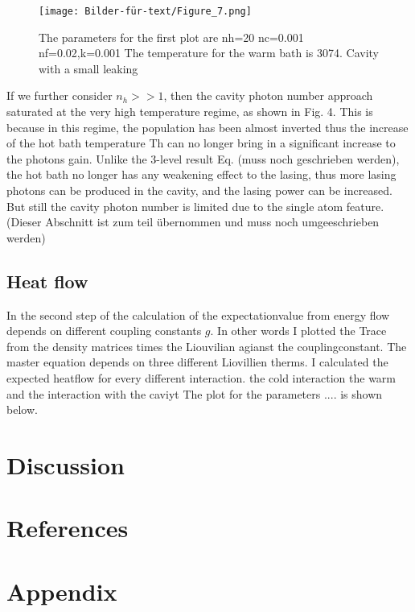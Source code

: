 \documentclass[12pt,a4paper]{article}
\begin{document}
\begin{figure}[h!]
\centering
\texttt{[image: Bilder-für-text/Figure\_7.png]}
\caption{The parameters for the first plot are nh=20 nc=0.001 nf=0.02,k=0.001 The temperature for the warm bath is 3074. Cavity with a small leaking}
\end{figure}

If we further consider  $n_h >>1$,
then the cavity photon number approach saturated at the very
high temperature regime, as shown in Fig. 4. This is because
in this regime, the population has been almost inverted
 thus the increase of the hot bath temperature Th
can no longer bring in a significant increase to the photons gain.
Unlike the 3-level result Eq. (muss noch geschrieben werden), the hot bath no longer has
any weakening effect to the lasing, thus more lasing photons
can be produced in the cavity, and the lasing power can be
increased. But still the cavity photon number is limited due to
the single atom feature.(Dieser Abschnitt ist zum teil übernommen und muss noch umgeeschrieben werden)
\subsection{Heat flow}
In the second step of the calculation of the  expectationvalue from energy flow depends on different coupling constants $g$.
In other words I plotted the Trace from the density matrices times the Liouvilian agianst the couplingconstant.
The master equation depends on three different Liovillien therms. I calculated the expected heatflow for every different interaction. the cold interaction the warm and the interaction with the caviyt
The plot for the parameters .... is shown below.


\newpage

\section{Discussion}

\section{References}




\section{Appendix}
\end{document}
